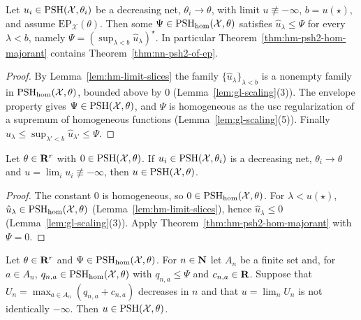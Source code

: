 \begin{corollary}\label{cor:hm-majorant-of-ep}
\leanok
{}
Let $u_i\in\operatorname{PSH}(\mathcal X,\theta_i)$ be a decreasing net, $\theta_i\to\theta$, with limit $u\not\equiv-\infty$, $b=u(\star)$, and assume
$\mathrm{EP}_{\mathcal X}(\theta)$. Then some $\Psi\in\operatorname{PSH}_{\mathrm{hom}}(\mathcal X,\theta)$ satisfies $\hat u_\lambda\le\Psi$ for every $\lambda<b$, namely
$\Psi=(\sup_{\lambda<b}\hat u_\lambda)^\star$. In particular Theorem~\ref{thm:hm-psh2-hom-majorant} contains Theorem~\ref{thm:nn-psh2-of-ep}.
\end{corollary}

\begin{proof}
By Lemma~\ref{lem:hm-limit-slices} the family $\{\hat u_\lambda\}_{\lambda<b}$ is a nonempty family in $\operatorname{PSH}_{\mathrm{hom}}(\mathcal X,\theta)$, bounded above by $0$
(Lemma~\ref{lem:gl-scaling}(3)). The envelope property gives $\Psi\in\operatorname{PSH}(\mathcal X,\theta)$, and $\Psi$ is homogeneous as the usc regularization of a supremum of
homogeneous functions (Lemma~\ref{lem:gl-scaling}(5)). Finally $\hat u_\lambda\le\sup_{\lambda'<b}\hat u_{\lambda'}\le\Psi$.
\end{proof}

\begin{corollary}\label{cor:hm-majorant-zero}
\leanok
{}
Let $\theta\in\mathbf{R}^r$ with $0\in\operatorname{PSH}(\mathcal X,\theta)$. If $u_i\in\operatorname{PSH}(\mathcal X,\theta_i)$ is a decreasing net, $\theta_i\to\theta$ and $u=\lim_iu_i\not\equiv-\infty$,
then $u\in\operatorname{PSH}(\mathcal X,\theta)$.
\end{corollary}

\begin{proof}
The constant $0$ is homogeneous, so $0\in\operatorname{PSH}_{\mathrm{hom}}(\mathcal X,\theta)$. For $\lambda<u(\star)$, $\hat u_\lambda\in\operatorname{PSH}_{\mathrm{hom}}(\mathcal X,\theta)$
(Lemma~\ref{lem:hm-limit-slices}), hence $\hat u_\lambda\le0$ (Lemma~\ref{lem:gl-scaling}(3)). Apply Theorem~\ref{thm:hm-psh2-hom-majorant} with $\Psi=0$.
\end{proof}

\begin{lemma}\label{lem:hm-carrier-limit}
\leanok
{}
Let $\theta\in\mathbf{R}^r$ and $\Psi\in\operatorname{PSH}_{\mathrm{hom}}(\mathcal X,\theta)$. For $n\in\mathbf{N}$ let $A_n$ be a finite set and, for $a\in A_n$,
$q_{n,a}\in\operatorname{PSH}_{\mathrm{hom}}(\mathcal X,\theta)$ with $q_{n,a}\le\Psi$ and $c_{n,a}\in\mathbf{R}$. Suppose that $U_n=\max_{a\in A_n}(q_{n,a}+c_{n,a})$ decreases
in $n$ and that $u=\lim_nU_n$ is not identically $-\infty$. Then $u\in\operatorname{PSH}(\mathcal X,\theta)$.
\end{lemma}

